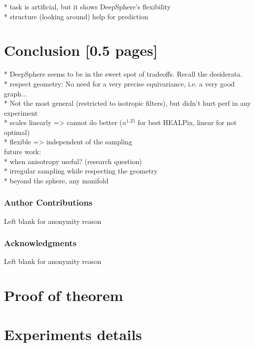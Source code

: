 \documentclass{article} %
\begin{document}
* task is artificial, but it shows DeepSphere's flexibility\\
* structure (looking around) help for prediction\\

\section{Conclusion [0.5 pages]}

* DeepSphere seems to be in the sweet spot of tradeoffs. Recall the desiderata.\\
  * respect geometry: No need for a very precise equivariance, i.e. a very good graph...\\
  * Not the most general (restricted to isotropic filters), but didn't hurt perf in any experiment\\
  * scales linearly => cannot do better ($n^1.25$ for best HEALPix, linear for not optimal)\\
  * flexible => independent of the sampling\\

future work:\\
* when anisotropy useful? (research question)\\
* irregular sampling while respecting the geometry\\
* beyond the sphere, any manifold\\

\newpage
\subsubsection*{Author Contributions}
Left blank for anonymity reason

\subsubsection*{Acknowledgments}
Left blank for anonymity reason




\newpage

{\LARGE {}}
\appendix

\section{Proof of theorem}


\section{Experiments details}
\end{document}
